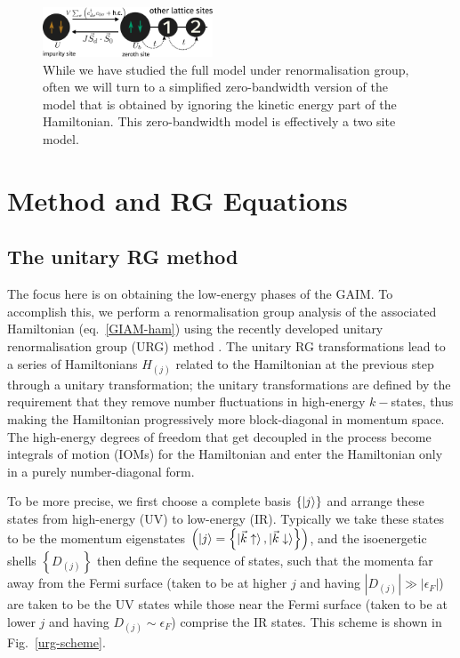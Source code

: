 \documentclass[reprint,superscriptaddress,floatfix]{revtex4-2}
\begin{document}
\begin{figure}[!htb]
	\centering
	\includegraphics[width=0.45\textwidth]{../figures/zeromode_bare.pdf}
	\caption{While we have studied the full model under renormalisation group, often we will turn to a simplified zero-bandwidth version of the model that is obtained by ignoring the kinetic energy part of the Hamiltonian. This zero-bandwidth model is effectively a two site model.}
	\label{zeromode-bare}
\end{figure}

\section{Method and RG Equations}

\subsection{The unitary RG method}
The focus here is on obtaining the low-energy phases of the GAIM. To accomplish this, we perform a renormalisation group analysis of the associated Hamiltonian (eq.~\ref{GIAM-ham}) using the recently developed unitary renormalisation group (URG) method \cite{anirbanmott1,anirbanmott2,anirbanurg1,anirbanurg2,siddharthacpi,santanukagome,1dhubjhep,Mukherjee_mott_merg,anirban_kondo}. The unitary RG transformations lead to a series of Hamiltonians \(H_{(j)}\) related to the Hamiltonian at the previous step through a unitary transformation; the unitary transformations are defined by the requirement that they remove number fluctuations in high-energy \(k-\)states, thus making the Hamiltonian progressively more block-diagonal in momentum space. The high-energy degrees of freedom that get decoupled in the process become integrals of motion (IOMs) for the Hamiltonian and enter the Hamiltonian only in a purely number-diagonal form.

To be more precise, we first choose a complete basis \(\left\{ \ket{j} \right\} \) and arrange these states from high-energy (UV) to low-energy (IR). Typically we take these states to be the momentum eigenstates \(\left(\ket{j} = \left\{\ket{\vec k \uparrow}, \ket{\vec k \downarrow}\right\}\right)\), and the isoenergetic shells \(\left\{D_{(j)}\right\}\) then define the sequence of states, such that the momenta far away from the Fermi surface (taken to be at higher \(j\) and having \(|D_{(j)}| \gg |\epsilon_F|\)) are taken to be the UV states while those near the Fermi surface (taken to be at lower \(j\) and having \(D_{(j)} \sim \epsilon_F\)) comprise the IR states. This scheme is shown in Fig.~\ref{urg-scheme}.
\end{document}

